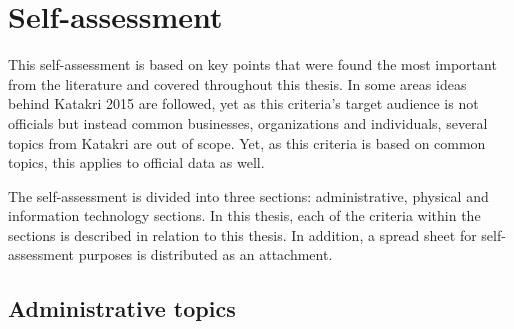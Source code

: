 \documentclass{article}
\begin{document}
\section{Self-assessment}
This self-assessment is based on key points that were found the most important from the literature and covered throughout this thesis. In some areas ideas behind Katakri 2015 are followed, yet as this criteria's target audience is not officials but instead common businesses, organizations and individuals, several topics from Katakri are out of scope. Yet, as this criteria is based on common topics, this applies to official data as well.
\par
The self-assessment is divided into three sections: administrative, physical and information technology sections. In this thesis, each of the criteria within the sections is described in relation to this thesis. In addition, a spread sheet for self-assessment purposes is distributed as an attachment.
\subsection{Administrative topics}
\end{document}
